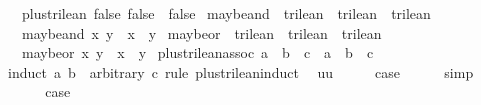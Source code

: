 \begin{isabellebody}
\ \ {\isachardoublequoteopen}plus{\isacharunderscore}trilean\ false\ false\ {\isacharequal}\ false{\isachardoublequoteclose}\isanewline
\isanewline
{}\isamarkupfalse%
\ maybe{\isacharunderscore}and\ {\isacharcolon}{\isacharcolon}\ {\isachardoublequoteopen}trilean\ {\isasymRightarrow}\ trilean\ {\isasymRightarrow}\ trilean{\isachardoublequoteclose}\ {\isacharparenleft}\ {\isachardoublequoteopen}{\isasymand}\isactrlsub {\isacharquery}{\isachardoublequoteclose}\ {}{}{\isacharparenright}\ \isanewline
\ \ {\isachardoublequoteopen}maybe{\isacharunderscore}and\ x\ y\ {\isasymequiv}\ x\ {\isacharasterisk}\ y{\isachardoublequoteclose}\isanewline
\isanewline
{}\isamarkupfalse%
\ maybe{\isacharunderscore}or\ {\isacharcolon}{\isacharcolon}\ {\isachardoublequoteopen}trilean\ {\isasymRightarrow}\ trilean\ {\isasymRightarrow}\ trilean{\isachardoublequoteclose}\ {\isacharparenleft}\ {\isachardoublequoteopen}{\isasymor}\isactrlsub {\isacharquery}{\isachardoublequoteclose}\ {}{}{\isacharparenright}\ \isanewline
\ \ {\isachardoublequoteopen}maybe{\isacharunderscore}or\ x\ y\ {\isasymequiv}\ x\ {\isacharplus}\ y{\isachardoublequoteclose}\isanewline
\isanewline
{}\isamarkupfalse%
\ plus{\isacharunderscore}trilean{\isacharunderscore}assoc{\isacharcolon}\ {\isachardoublequoteopen}a\ {\isasymor}\isactrlsub {\isacharquery}\ b\ {\isasymor}\isactrlsub {\isacharquery}\ c\ {\isacharequal}\ a\ {\isasymor}\isactrlsub {\isacharquery}\ {\isacharparenleft}b\ {\isasymor}\isactrlsub {\isacharquery}\ c{\isacharparenright}{\isachardoublequoteclose}\isanewline
%
\isadelimproof
%
\endisadelimproof
%
\isatagproof
{}\isamarkupfalse%
{\isacharparenleft}induct\ a\ b\ \ arbitrary{\isacharcolon}\ c\ rule{\isacharcolon}\ plus{\isacharunderscore}trilean{\isachardot}induct{\isacharparenright}\isanewline
{}\isamarkupfalse%
\ {\isacharparenleft}{}\ uu{\isacharparenright}\isanewline
\ \ \isamarkupfalse%
\ \isamarkupfalse%
\ {\isacharquery}case\isanewline
\ \ \ \ \isamarkupfalse%
\ simp\isanewline
{}\isamarkupfalse%
\isanewline
\ \ \isamarkupfalse%
\ {\isachardoublequoteopen}{}{\isacharunderscore}{}{\isachardoublequoteclose}\isanewline
\ \ \isamarkupfalse%
\ \isamarkupfalse%
\ {\isacharquery}case\isanewline
\ \ \ \ \isamarkupfalse%

\end{isabellebody}
